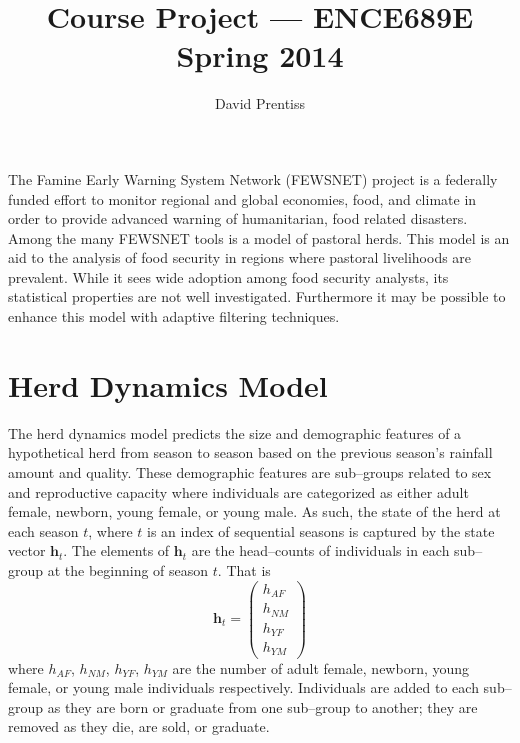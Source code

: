 \documentclass[letterpaper]{tufte-handout}
\title{Course Project --- ENCE689E Spring 2014}
\author{David Prentiss}
\newcommand{\vech}{\mathbf{h}}
\begin{document}
\maketitle

The Famine Early Warning System Network (FEWSNET) project is a federally funded effort to monitor regional and global economies, food, and climate in order to provide advanced warning of humanitarian, food related disasters.
Among the many FEWSNET tools is a model of pastoral herds. This model\cite{fewsnet} is an aid to the analysis of food security in regions where pastoral livelihoods are prevalent. While it sees wide adoption among food security analysts, its statistical properties are not well investigated. Furthermore it may be possible to enhance this model with adaptive filtering techniques.

\section{Herd Dynamics Model}
The herd dynamics model predicts the size and demographic features of a hypothetical herd from season to season based on the previous season's rainfall amount and quality.
These demographic features are sub--groups related to sex and reproductive capacity where individuals are categorized as either adult female, newborn, young female, or young male.
As such, the state of the herd at each season $t$, where $t$ is an index of sequential seasons is captured by the state vector $\vech_t$.
The elements of $\vech_t$ are the head--counts of individuals in each sub--group at the beginning of season $t$.
That is
\begin{equation}
\vech_t = \begin{pmatrix} h_{AF} \\ h_{NM} \\ h_{YF} \\ h_{YM} \end{pmatrix}
\end{equation}
where $h_{AF}$, $h_{NM}$, $h_{YF}$, $h_{YM}$ are the number of adult female, newborn, young female, or young male individuals respectively.
Individuals are added to each sub--group as they are born or graduate from one sub--group to another; they are removed as they die, are sold, or graduate.
\end{document}
